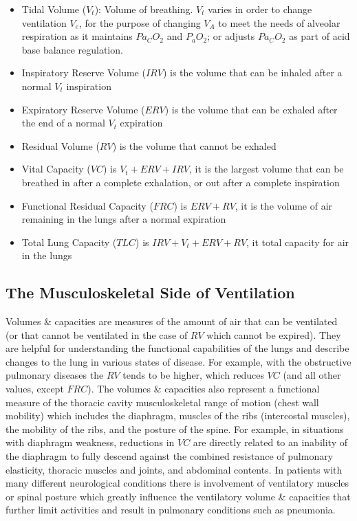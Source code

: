 \begin{itemize}
    \item Tidal Volume ($V_t$): Volume of breathing. $V_t$ varies in order to change ventilation $V_e$, for the purpose of changing $V_A$ to meet the needs of alveolar respiration as it maintains $Pa_CO_2$ and $P_aO_2$; or adjusts $Pa_CO_2$ as part of acid base balance regulation.
    \item Inspiratory Reserve Volume ($IRV$) is the volume that can be inhaled after a normal $V_t$ inspiration
    \item Expiratory Reserve Volume ($ERV$) is the volume that can be exhaled after the end of a normal $V_t$ expiration
    \item Residual Volume ($RV$) is the volume that cannot be exhaled
    \item Vital Capacity ($VC$) is $V_t + ERV + IRV$, it is the largest volume that can be breathed in after a complete exhalation, or out after a complete inspiration
    \item Functional Residual Capacity ($FRC$) is $ERV + RV$, it is the volume of air remaining in the lungs after a normal expiration
    \item Total Lung Capacity ($TLC$) is $IRV + V_t + ERV + RV$, it total capacity for air in the lungs
\end{itemize}

\subsection{The Musculoskeletal Side of Ventilation} 

Volumes \& capacities are measures of the amount of air that can be ventilated (or that cannot be ventilated in the case of $RV$ which cannot be expired). They are helpful for understanding the functional capabilities of the lungs and describe changes to the lung in various states of disease. For example, with the obstructive pulmonary diseases the $RV$ tends to be higher, which reduces $VC$ (and all other values, except $FRC$). The volumes \& capacities also represent a functional measure of the thoracic cavity musculoskeletal range of motion (chest wall mobility) which includes the diaphragm, muscles of the ribs (intercostal muscles), the mobility of the ribs, and the posture of the spine. For example, in situations with diaphragm weakness, reductions in $VC$ are directly related to an inability of the diaphragm to fully descend against the combined resistance of pulmonary elasticity, thoracic muscles and joints, and abdominal contents. In patients with many different neurological conditions there is involvement of ventilatory muscles or spinal posture which greatly influence the ventilatory volume \& capacities that further limit activities and result in pulmonary conditions such as pneumonia.

